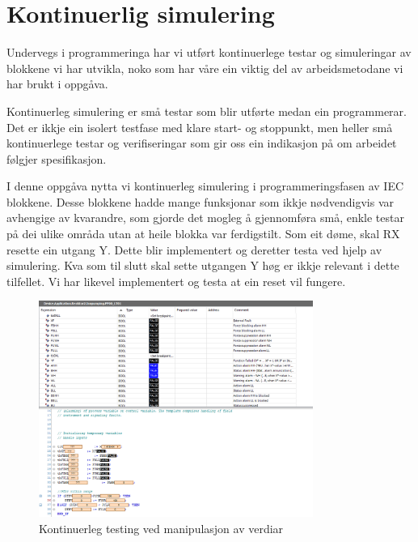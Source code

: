 \section{Kontinuerlig simulering}
\thispagestyle{fancy}

Undervegs i programmeringa har vi utført kontinuerlege testar og simuleringar av blokkene vi har utvikla, noko
som har våre ein viktig del av arbeidsmetodane vi har brukt i oppgåva. 

Kontinuerleg simulering er små testar som blir utførte medan ein programmerar.
Det er ikkje ein isolert testfase med klare start- og stoppunkt, men heller små kontinuerlege testar og verifiseringar som gir oss ein indikasjon
på om arbeidet følgjer spesifikasjon.

I denne oppgåva nytta vi kontinuerleg simulering i programmeringsfasen av \gls{IEC} blokkene.
Desse blokkene hadde mange funksjonar som ikkje nødvendigvis var avhengige av kvarandre,
som gjorde det mogleg å gjennomføra små, enkle testar på dei ulike områda utan at heile blokka var ferdigstilt.\newline
Som eit døme, skal \gls{RX} resette ein utgang \gls{Y}. Dette blir implementert og deretter testa ved hjelp av simulering.
Kva som til slutt skal sette utgangen \gls{Y} høg er ikkje relevant i dette tilfellet. Vi har likevel implementert 
og testa at ein reset vil fungere.


\begin{figure}[htbp]
    \centering
    \includegraphics[width=0.8\textwidth]{Bilder/kontinuerligSimulering.png}
    \caption{Kontinuerleg testing ved manipulasjon av verdiar}\label{fig:KontinuerlegSimulering}
\end{figure}


\newpage

